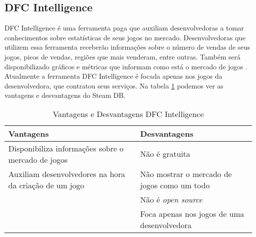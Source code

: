 \subsection{DFC Intelligence}
DFC Intelligence é uma ferramenta paga que auxiliam desenvolvedoras a tomar conhecimentos sobre estatísticas de seus jogos no mercado. Desenvolvedoras que utilizem essa ferramenta receberão informações sobre o número de vendas de seus jogos, picos de vendas, regiões que mais venderam, entre outras. Também será disponibilizado gráficos e métricas que informam como está o mercado de jogos \cite{dfc_intelligence}. Atualmente a ferramenta DFC Intelligence é focada apenas nos jogos da desenvolvedora, que contratou seus serviços. Na tabela \ref{table:dfc_intelligence} podemos ver as vantagens e desvantagens do Steam DB.
\begin{table}
\centering
\begin{tabular}{|p{7cm}|p{7cm}|}
\hline \textbf{Vantagens} & \textbf{Desvantagens} \\
\hline Disponibiliza informações sobre o mercado de jogos & Não é gratuita \\
\hline Auxiliam desenvolvedores na hora da criação de um jogo & Não mostrar o mercado de jogos como um todo \\
\hline & Não é \textit{open source} \\
\hline & Foca apenas nos jogos de uma desenvolvedora \\
\hline
\end{tabular}
\caption{Vantagens e Desvantagens DFC Intelligence}
\label{table:dfc_intelligence}
\end{table}